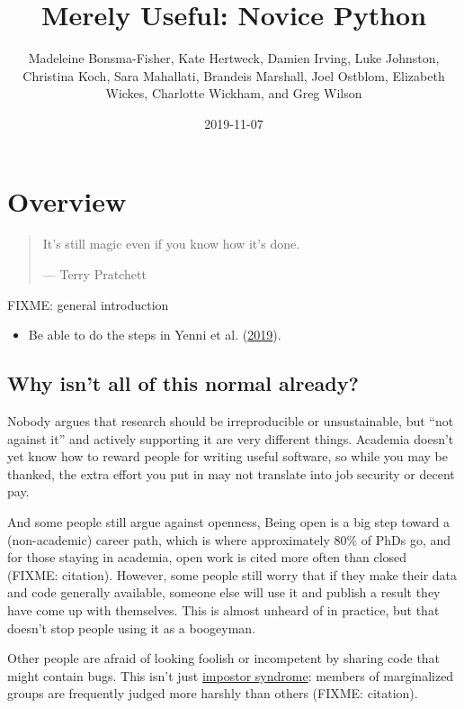 \documentclass[]{Nemilov}
\title{Merely Useful: Novice Python}
\author{Madeleine Bonsma-Fisher, Kate Hertweck, Damien Irving, Luke Johnston, Christina Koch, Sara Mahallati, Brandeis Marshall, Joel Ostblom, Elizabeth Wickes, Charlotte Wickham, and Greg Wilson}
\date{2019-11-07}
\providecommand{\tightlist}{%
  \setlength{\itemsep}{0pt}\setlength{\parskip}{0pt}}
\begin{document}
\maketitle

{
\setcounter{tocdepth}{1}
\tableofcontents
}
\listoftables
\listoffigures
\hypertarget{overview}{%
\chapter{Overview}\label{overview}}

\begin{quote}
It's still magic even if you know how it's done.

--- Terry Pratchett
\end{quote}

FIXME: general introduction

\begin{itemize}
\tightlist
\item
  Be able to do the steps in Yenni et al. (\protect\hyperlink{ref-Yenn2019}{2019}).
\end{itemize}

\hypertarget{overview-against}{%
\section{Why isn't all of this normal already?}\label{overview-against}}

Nobody argues that research should be irreproducible or unsustainable,
but ``not against it'' and actively supporting it are very different things.
Academia doesn't yet know how to reward people for writing useful software,
so while you may be thanked,
the extra effort you put in may not translate into job security or decent pay.

And some people still argue against openness,
Being open is a big step toward a (non-academic) career path,
which is where approximately 80\% of PhDs go,
and for those staying in academia,
open work is cited more often than closed (FIXME: citation).
However,
some people still worry that if they make their data and code generally available,
someone else will use it and publish a result they have come up with themselves.
This is almost unheard of in practice,
but that doesn't stop people using it as a boogeyman.

Other people are afraid of looking foolish or incompetent by sharing code that might contain bugs.
This isn't just \href{glossary.html\#impostor-syndrome}{impostor syndrome}:
members of marginalized groups are frequently judged more harshly than others (FIXME: citation).
\end{document}
